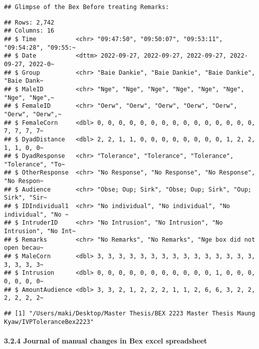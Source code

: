 \documentclass[
]{article}
\begin{document}
\begin{verbatim}
## Glimpse of the Bex Before treating Remarks:
\end{verbatim}

\begin{verbatim}
## Rows: 2,742
## Columns: 16
## $ Time           <chr> "09:47:50", "09:50:07", "09:53:11", "09:54:28", "09:55:~
## $ Date           <dttm> 2022-09-27, 2022-09-27, 2022-09-27, 2022-09-27, 2022-0~
## $ Group          <chr> "Baie Dankie", "Baie Dankie", "Baie Dankie", "Baie Dank~
## $ MaleID         <chr> "Nge", "Nge", "Nge", "Nge", "Nge", "Nge", "Nge", "Nge",~
## $ FemaleID       <chr> "Oerw", "Oerw", "Oerw", "Oerw", "Oerw", "Oerw", "Oerw",~
## $ FemaleCorn     <dbl> 0, 0, 0, 0, 0, 0, 0, 0, 0, 0, 0, 0, 0, 0, 0, 7, 7, 7, 7~
## $ DyadDistance   <dbl> 2, 2, 1, 1, 0, 0, 0, 0, 0, 0, 0, 0, 1, 2, 2, 1, 1, 0, 0~
## $ DyadResponse   <chr> "Tolerance", "Tolerance", "Tolerance", "Tolerance", "To~
## $ OtherResponse  <chr> "No Response", "No Response", "No Response", "No Respon~
## $ Audience       <chr> "Obse; Oup; Sirk", "Obse; Oup; Sirk", "Oup; Sirk", "Sir~
## $ IDIndividual1  <chr> "No individual", "No individual", "No individual", "No ~
## $ IntruderID     <chr> "No Intrusion", "No Intrusion", "No Intrusion", "No Int~
## $ Remarks        <chr> "No Remarks", "No Remarks", "Nge box did not open becau~
## $ MaleCorn       <dbl> 3, 3, 3, 3, 3, 3, 3, 3, 3, 3, 3, 3, 3, 3, 3, 3, 3, 3, 3~
## $ Intrusion      <dbl> 0, 0, 0, 0, 0, 0, 0, 0, 0, 0, 0, 1, 0, 0, 0, 0, 0, 0, 0~
## $ AmountAudience <dbl> 3, 3, 2, 1, 2, 2, 2, 1, 1, 2, 6, 6, 3, 2, 2, 2, 2, 2, 2~
\end{verbatim}

\begin{verbatim}
## [1] "/Users/maki/Desktop/Master Thesis/BEX 2223 Master Thesis Maung Kyaw/IVPToleranceBex2223"
\end{verbatim}

\hypertarget{journal-of-manual-changes-in-bex-excel-spreadsheet}{%
\paragraph{3.2.4 Journal of manual changes in Bex excel
spreadsheet}\label{journal-of-manual-changes-in-bex-excel-spreadsheet}}
\end{document}
